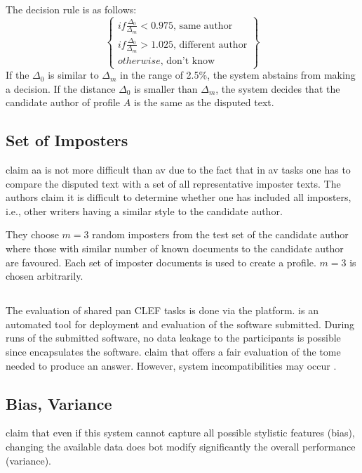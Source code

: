The decision rule is as follows:
$$\left\{ \begin{matrix}
if \frac{\Delta_0}{\Delta_m} < 0.975 \text{, same author} \\
if \frac{\Delta_0}{\Delta_m} > 1.025 \text{, different author}\\
otherwise \text{, don't know}
\end{matrix}\right\}$$
If the $\Delta_0$ is similar to $\Delta_m$ in the range of 2.5\%, the system abstains from making a decision.
If the distance $\Delta_0$ is smaller than $\Delta_m$, the system decides that the candidate author of profile $A$ is the same as the disputed text.

\subsection{Set of Imposters}

\citet{kocher_unine_2015} claim \ac{aa} is not more difficult than \ac{av} 
due to the fact that in \ac{av} tasks one has to compare the disputed text with a set of all representative imposter texts.
The authors claim it is difficult to determine whether one has included all imposters, 
i.e., other writers having a similar style to the candidate author.

They choose $m=3$ random imposters from the test set of the candidate author 
where those with similar number of known documents to the candidate author are favoured.
Each set of imposter documents is used to create a profile.
$m=3$ is chosen arbitrarily.

\subsection{\tira{}}
\label{sec:tira}

The evaluation of shared \ac{pan} CLEF tasks is done via the \tira{} platform.
\tira{} is an automated tool for deployment and evaluation of the software submitted.
During runs of the submitted software, no data leakage to the participants is possible since \tira{} encapsulates the software.
\citet{kocher_unine_2015} claim that \tira{} offers a fair evaluation of the tome needed to produce an answer.
However, system incompatibilities may occur \citep{kocher_unine_2015}.

\subsection{Bias, Variance}
\citet{kocher_unine_2015} claim that even if this system cannot capture all possible stylistic features (bias), 
changing the available data does bot modify significantly the overall performance (variance).
